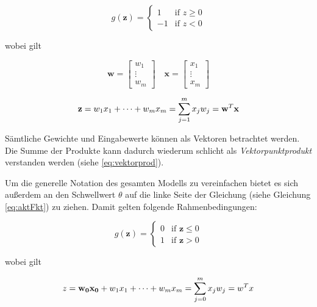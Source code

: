 \begin{equation} \label{eq:aktFkt}
g(\mathbf{z}) =\begin{cases}
    1 & \mbox{if } z \geq 0 \\
	-1 & \mbox{if } z < 0 
  \end{cases}
\end{equation}

wobei gilt

\begin{equation} \label{eq:vektorprod}
\mathbf{w} = \begin{bmatrix}
    w_{1}  \\
    \vdots \\
    w_{m}
\end{bmatrix}
\quad  \mathbf{x} = \begin{bmatrix}
    x_{1}  \\
    \vdots \\
    x_{m}
\end{bmatrix}
\end{equation}

\begin{equation}
\mathbf{z} =  w_1x_{1} + \dots + w_mx_{m} = \sum_{j=1}^{m} x_{j}w_{j} \\ = \mathbf{w}^T\mathbf{x}
\end{equation}

Sämtliche Gewichte und Eingabewerte können als Vektoren betrachtet werden. Die Summe der Produkte kann dadurch wiederum schlicht als \emph{Vektorpunktprodukt} verstanden werden (siehe \autoref{eq:vektorprod}).

Um die generelle Notation des gesamten Modells zu vereinfachen bietet es sich außerdem an den Schwellwert $\theta$ auf die linke Seite der Gleichung (siehe Gleichung \ref{eq:aktFkt}) zu ziehen. Damit gelten folgende Rahmenbedingungen:

\begin{equation} \label{eq:aktFkt2}
g(\mathbf{z}) =\begin{cases}
	0 & \mbox{if } \mathbf{z} \leq 0 \\
    1 & \mbox{if } \mathbf{z} > 0
  \end{cases}
\end{equation}

wobei gilt

\begin{equation} \label{eq:vektorprod}
z =  \mathbf{w_0x_{0}} + w_1x_{1} + \dots + w_mx_{m} = \sum_{j=0}^{m} x_{j}w_{j} \\ = w^Tx
\end{equation}

